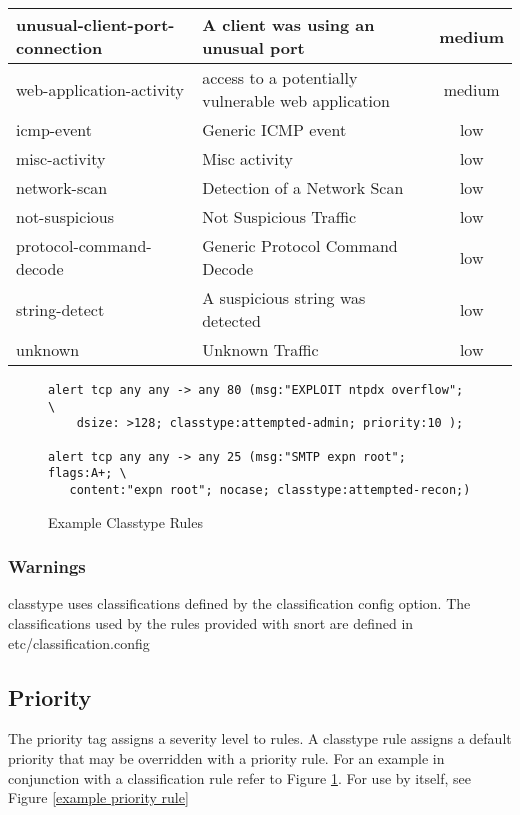 \documentclass[english]{report}
\begin{document}
\begin{center}
\begin{longtable}{|p{2in}|p{2.5in}|c|}
\hline 
unusual-client-port-connection&
A client was using an unusual port & medium\\
\hline 
web-application-activity&
access to a potentially vulnerable web application & medium\\
\hline
icmp-event&
Generic ICMP event & low\\
\hline 
misc-activity&
Misc activity & low\\
\hline 
network-scan&
Detection of a Network Scan & low\\
\hline 
not-suspicious&
Not Suspicious Traffic & low\\
\hline 
protocol-command-decode&
Generic Protocol Command Decode & low\\
\hline 
string-detect&
A suspicious string was detected & low\\
\hline 
unknown&
Unknown Traffic & low\\
\hline
\end{longtable}
\end{center}


\begin{figure}[!hbpt]
\begin{verbatim}
alert tcp any any -> any 80 (msg:"EXPLOIT ntpdx overflow"; \ 
    dsize: >128; classtype:attempted-admin; priority:10 );

alert tcp any any -> any 25 (msg:"SMTP expn root"; flags:A+; \
   content:"expn root"; nocase; classtype:attempted-recon;)
\end{verbatim}
\caption{Example Classtype Rules\label{example classification rules}}
\end{figure}

\subsubsection{Warnings}

classtype uses classifications defined by the classification config option.  The classifications used by the rules provided with snort are defined in etc/classification.config

\subsection{Priority}

The priority tag assigns a severity level to rules. A classtype rule
assigns a default priority that may be overridden with a priority
rule. For an example in conjunction with a classification rule refer
to Figure \ref{example classification rules}. For use by itself,
see Figure \ref{example priority rule}
\end{document}

